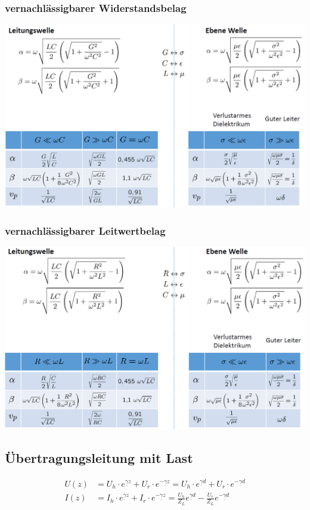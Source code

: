 \subsubsection{vernachlässigbarer Widerstandsbelag}
\includegraphics[width=\columnwidth]{Figures/vernachlaessigbarerWiderstandsbelag.png}


\subsubsection{vernachlässigbarer Leitwertbelag}
\includegraphics[width=\columnwidth]{Figures/vernachlaessigbarerLeiterwertbelag.png}

\subsection{Übertragungsleitung mit Last}



\begin{align*}
    U(z) & = U_h\cdot  e^{\underline{\gamma} z} + U_r\cdot  e^{-\underline{\gamma} z} = U_h\cdot  e^{\underline{\gamma} d} + U_r\cdot  e^{-\underline{\gamma} d}           \\
    I(z) & = I_h\cdot  e^{\underline{\gamma} z} + I_r\cdot  e^{-\underline{\gamma} z} = \frac{U_h}{Z_L}e^{\underline{\gamma} d} - \frac{U_r}{Z_L}e^{-\underline{\gamma} d}
\end{align*}

